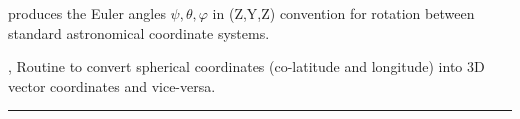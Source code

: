 
\begin{related}
  \begin{sulist}{} %
   \item[\htmlref{coordsys2euler\_zyz}{sub:coordsys2euler_zyz}] produces the
Euler angles
 $\psi, \theta, \varphi$ in (Z,Y,Z) convention for rotation between standard astronomical coordinate systems.
  \item[\htmlref{ang2vec}{sub:ang2vec}, \htmlref{vec2ang}{sub:vec2ang}] Routine to convert spherical coordinates
  (co-latitude and longitude) into 3D vector coordinates and vice-versa.
  \end{sulist}
\end{related}

\rule{\hsize}{2mm}

\newpage
